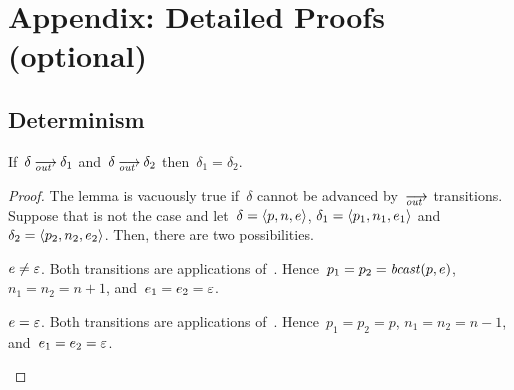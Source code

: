 \clearpage
\appendix
\section{Appendix: Detailed Proofs (optional)}
\label{sec.proofs}

\subsection*{Determinism}


\begin{lemma}
  \label{lem.det-out}
  If~$\delta\out\delta_1$ and~$\delta\out\delta_2$ then~$\delta_1=\delta_2$.
\end{lemma}
\begin{proof}
  The lemma is vacuously true if~$\delta$ cannot be advanced by~$\out$
  transitions.  Suppose that is not the case and let~$\delta=\<p,n,e>$,
  $\delta_1=\<p_1,n_1,e_1>$ and~$\delta_2=\<p_2,n_2,e_2>$.  Then, there are
  two possibilities.
  \begin{case}
    $e\ne\varepsilon$.  Both transitions are applications of~.
    Hence~$p_1=p_2=\operatorname{\mathit{bcast}}(p,e)$, $n_1=n_2=n+1$, and~$e_1=e_2=\varepsilon$.
  \end{case}
  \begin{case}
    $e=\varepsilon$.  Both transitions are applications of~.
    Hence~$p_1=p_2=p$, $n_1=n_2=n-1$, and~$e_1=e_2=\varepsilon$.\qedhere
  \end{case}
\end{proof}


